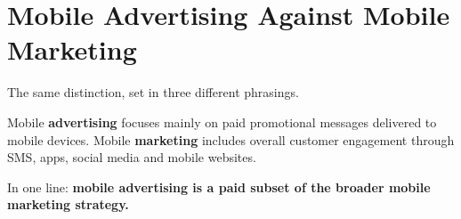 \section{Mobile Advertising Against Mobile Marketing}

\begin{keybox}
The same distinction, set in three different phrasings.
\end{keybox}

\begin{exambox}
Mobile \textbf{advertising} focuses mainly on paid promotional messages delivered
to mobile devices. Mobile \textbf{marketing} includes overall customer engagement
through SMS, apps, social media and mobile websites.

\smallskip
In one line: \textbf{mobile advertising is a paid subset of the broader mobile
marketing strategy.}
\end{exambox}

